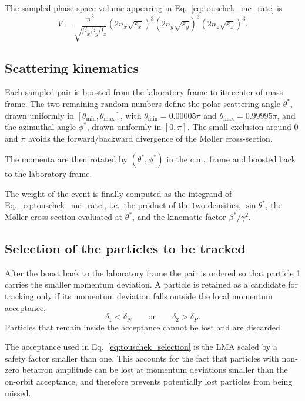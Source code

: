 The sampled phase-space volume appearing in Eq.~\eqref{eq:touschek_mc_rate} is
\begin{equation}
    V = \frac{\pi^2}{\sqrt{\beta_x \beta_y \beta_z}}
    \left( 2 n_x \sqrt{\varepsilon_x} \right)^3
    \left( 2 n_y \sqrt{\varepsilon_y} \right)^3
    \left( 2 n_z \sqrt{\varepsilon_z} \right)^3 .
    \label{eq:touschek_volume}
\end{equation}

\subsection{Scattering kinematics}
\label{section:touschek_kinematics}

Each sampled pair is boosted from the laboratory frame to its center-of-mass
frame. The two remaining random numbers define the polar scattering angle
$\theta^*$, drawn uniformly in
$[\theta_{\min}, \theta_{\max}]$, with
$\theta_{\min}=0.00005\pi$ and $\theta_{\max}=0.99995\pi$, and the azimuthal
angle $\phi^*$, drawn uniformly in $[0, \pi]$. The small exclusion around
$0$ and $\pi$ avoids the forward/backward divergence of the M\o ller
cross-section.

The momenta are then rotated by $(\theta^*, \phi^*)$ in the c.m.\ frame and
boosted back to the laboratory frame.

The weight of the event is finally computed
as the integrand of Eq.~\eqref{eq:touschek_mc_rate}, i.e.\ the product of the two
densities, $\sin\theta^*$, the M\o ller cross-section evaluated at $\theta^*$,
and the kinematic factor $\beta^*/\gamma^2$.

\subsection{Selection of the particles to be tracked}
\label{section:touschek_selection}

After the boost back to the laboratory frame the pair is ordered so that particle
1 carries the smaller momentum deviation. A particle is retained as a candidate
for tracking only if its momentum deviation falls outside the local momentum
acceptance,
\begin{equation}
    \delta_1 < \delta_N \qquad \text{or} \qquad \delta_2 > \delta_P .
    \label{eq:touschek_selection}
\end{equation}
Particles that remain inside the acceptance cannot be lost and are discarded.

The acceptance used in Eq.~\eqref{eq:touschek_selection} is the LMA scaled by a
safety factor smaller than one. This accounts for the fact that particles with
non-zero betatron amplitude can be lost at momentum deviations smaller than the
on-orbit acceptance, and therefore prevents potentially lost particles from being
missed.

